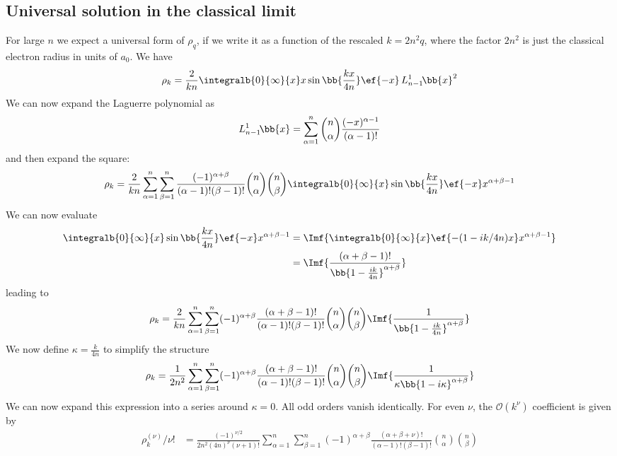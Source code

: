 \subsection{Universal solution in the classical limit}
For large $n$ we expect a universal form of $\rho_q$, if we write it as a function of the rescaled $k=2n^2 q$, where the factor $2n^2$ is just the classical electron radius in units of $a_0$. We have
\begin{align}
\rho_k = \frac{2}{k n}\integralb{0}{\infty}{x} x \sin\bb{\frac{kx}{4n}} \ef{-x} \, L_{n-1}^1\!\bb{x}^2
\end{align}
We can now expand the Laguerre polynomial as
\begin{align}
L_{n-1}^1\!\bb{x}=\sum_{\alpha=1}^{n} \binom{n}{\alpha} \frac{(-x)^{\alpha-1}}{(\alpha-1)!}
\end{align}
and then expand the square:
\begin{align}
\rho_k=\frac{2}{k n} \sum_{\alpha=1}^{n}\sum_{\beta=1}^{n} \frac{(-1)^{\alpha+\beta}}{(\alpha-1)! (\beta-1)!} \binom{n}{\alpha}\binom{n}{\beta} \integralb{0}{\infty}{x} \sin\bb{\frac{kx}{4n}} \ef{-x} x^{\alpha+\beta-1}
\end{align}
We can now evaluate
\begin{align}
    \integralb{0}{\infty}{x} \sin\bb{\frac{kx}{4n}} \ef{-x} x^{\alpha+\beta-1} &= \Imf{ \integralb{0}{\infty}{x} \ef{-(1-ik /4n)x} x^{\alpha+\beta-1}} \\
    &= \Imf{ \frac{(\alpha+\beta-1)!}{\bb{1-\frac{i k}{4n}}^{\alpha+\beta}} }
\end{align}
leading to
\begin{align}
    \rho_k=\frac{2}{k n} \sum_{\alpha=1}^{n}\sum_{\beta=1}^{n} (-1)^{\alpha+\beta} \frac{(\alpha+\beta-1)!}{(\alpha-1)! (\beta-1)!} \binom{n}{\alpha}\binom{n}{\beta} \Imf{ \frac{1}{\bb{1-\frac{i k}{4n}}^{\alpha+\beta}} }
\end{align}
We now define $\kappa=\frac{k}{4n}$ to simplify the structure
\begin{align}
    \rho_k=\frac{1}{2n^2} \sum_{\alpha=1}^{n}\sum_{\beta=1}^{n} (-1)^{\alpha+\beta} \frac{(\alpha+\beta-1)!}{(\alpha-1)! (\beta-1)!} \binom{n}{\alpha}\binom{n}{\beta} \Imf{ \frac{1}{\kappa\bb{ 1-i\kappa }^{\alpha+\beta}} }
\end{align}
We can now expand this expression into a series around $\kappa=0$. All odd orders vanish identically. For even $\nu$, the $\mathcal{O}(k^\nu)$ coefficient is given by
\begin{align}
\rho^{(\nu)}_k/\nu! &=\frac{(-1)^{\nu/2}}{2n^2 (4n)^\nu (\nu+1)!} \sum_{\alpha=1}^{n}\sum_{\beta=1}^{n} (-1)^{\alpha+\beta} \frac{(\alpha+\beta+\nu)!}{(\alpha-1)! (\beta-1)!} \binom{n}{\alpha}\binom{n}{\beta}
\end{align}
